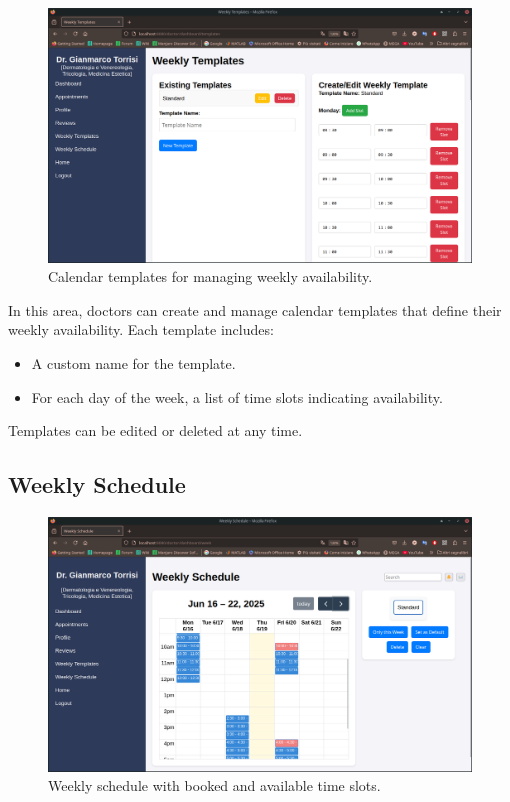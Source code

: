 \begin{figure}
	\centering
	\includegraphics[scale=0.30]{resources/screenshots/doctor_ui/template.png}
	\caption{Calendar templates for managing weekly availability.}
	\label{fig:calendar_templates}
\end{figure}

In this area, doctors can create and manage calendar templates that define their weekly availability. Each template includes:
\begin{itemize}
	\item A custom name for the template.
	\item For each day of the week, a list of time slots indicating availability.
\end{itemize}
Templates can be edited or deleted at any time.

\subsection{Weekly Schedule}

\begin{figure}[!h]
	\centering
	\includegraphics[scale=0.30]{resources/screenshots/doctor_ui/schedule.png}
	\caption{Weekly schedule with booked and available time slots.}
	\label{fig:weekly_schedule}
\end{figure}

